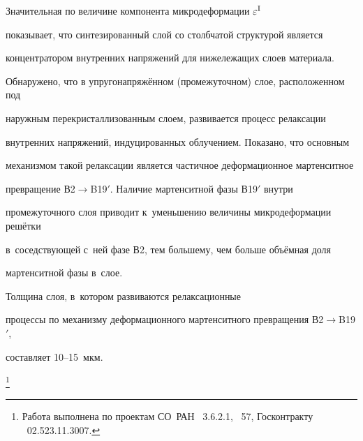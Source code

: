 Значительная по величине компонента микродеформации $\varepsilon ^{\rm I}$

показывает, что синтезированный слой со столбчатой структурой является

концентратором внутренних напряжений для нижележащих слоев материала.



Обнаружено, что в упругонапряжённом (промежуточном) слое, расположенном под

наружным перекристаллизованным слоем, развивается процесс релаксации

внутренних напряжений, индуцированных облучением. Показано, что основным

механизмом такой релаксации является частичное деформационное мартенситное

превращение В2$\to $B19$'$. Наличие мартенситной фазы В19$'$ внутри

промежуточного слоя приводит к~уменьшению величины микродеформации решётки

в~соседствующей с~ней фазе В2, тем большему, чем больше объёмная доля

мартенситной фазы в~слое.

Толщина слоя, в~котором развиваются релаксационные

процессы по механизму деформационного мартенситного превращения В2$\to$B19$'$,

составляет 10--15~мкм.



{\thanks{Работа выполнена по проектам СО~РАН {\rm \No~3.6.2.1, \No~57,} Госконтракту \rm \No~02.523.11.3007.}}



